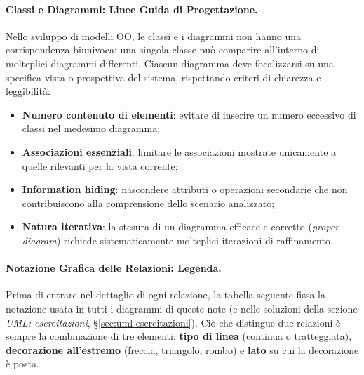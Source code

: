 \documentclass[12pt]{extarticle}
\begin{document}
\paragraph{Classi e Diagrammi: Linee Guida di Progettazione.}
Nello sviluppo di modelli OO, le classi e i diagrammi non hanno una corrispondenza biunivoca: una singola classe può comparire all'interno di molteplici diagrammi differenti.
Ciascun diagramma deve focalizzarsi su una specifica vista o prospettiva del sistema, rispettando criteri di chiarezza e leggibilità:
\begin{itemize}
    \item \textbf{Numero contenuto di elementi}: evitare di inserire un numero eccessivo di classi nel medesimo diagramma;
    \item \textbf{Associazioni essenziali}: limitare le associazioni mostrate unicamente a quelle rilevanti per la vista corrente;
    \item \textbf{Information hiding}: nascondere attributi o operazioni secondarie che non contribuiscono alla comprensione dello scenario analizzato;
    \item \textbf{Natura iterativa}: la stesura di un diagramma efficace e corretto (\textit{proper diagram}) richiede sistematicamente molteplici iterazioni di raffinamento.
\end{itemize}

\paragraph{Notazione Grafica delle Relazioni: Legenda.}\label{par:uml-notazione-relazioni}
Prima di entrare nel dettaglio di ogni relazione, la tabella seguente fissa la notazione usata in tutti i diagrammi di queste note (e nelle soluzioni della sezione \emph{UML: esercitazioni}, \S\ref{sec:uml-esercitazioni}). Ciò che distingue due relazioni è sempre la combinazione di tre elementi: \textbf{tipo di linea} (continua o tratteggiata), \textbf{decorazione all'estremo} (freccia, triangolo, rombo) e \textbf{lato} su cui la decorazione è posta.
\end{document}
